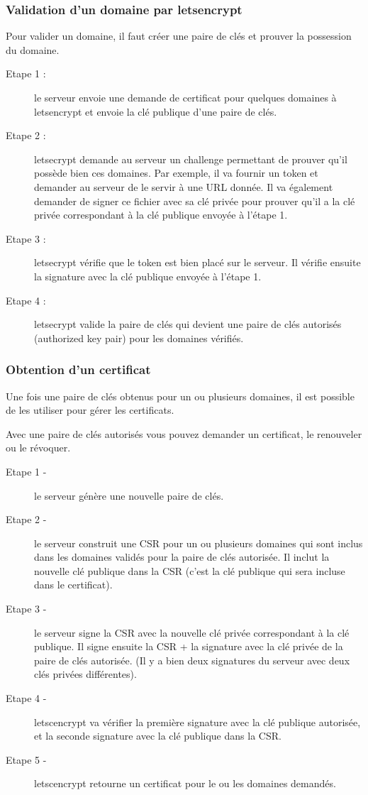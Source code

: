 \documentclass{article}
\begin{document}
\subsubsection{Validation d'un domaine par letsencrypt}
Pour valider un domaine, il faut créer une paire de clés et prouver la possession du domaine.
\begin{description}
\item[Etape 1 :] le serveur envoie une demande de certificat pour quelques domaines à letsencrypt et envoie la clé publique d'une paire de clés.

\item[Etape 2 :] letsecrypt demande au serveur un challenge permettant de prouver qu'il possède bien ces domaines. Par exemple, il va fournir un token et demander au serveur de le servir à une URL donnée. Il va également demander de signer ce fichier avec sa clé privée pour prouver qu'il a la clé privée correspondant à la clé publique envoyée à l'étape 1.

\item[Etape 3 :] letsecrypt vérifie que le token est bien placé sur le serveur. Il vérifie ensuite la signature avec la clé publique envoyée à l'étape 1.

\item[Etape 4 :] letsecrypt valide la paire de clés qui devient une paire de clés autorisés (authorized key pair) pour les domaines vérifiés.

\end{description}
\subsubsection{Obtention d'un certificat}
Une fois une paire de clés obtenus pour un ou plusieurs domaines, il est possible de les utiliser pour gérer les certificats.

Avec une paire de clés autorisés vous pouvez demander un certificat, le renouveler ou le révoquer.
\begin{description}
\item[Etape 1 - ] le serveur génère une nouvelle paire de clés.

\item[Etape 2 - ] le serveur construit une CSR pour un ou plusieurs domaines qui sont inclus dans les domaines validés pour la paire de clés autorisée. Il inclut la nouvelle clé publique dans la CSR (c'est la clé publique qui sera incluse dans le certificat).

\item[Etape 3 - ] le serveur signe la CSR avec la nouvelle clé privée correspondant à la clé publique. Il signe ensuite la CSR + la signature avec la clé privée de la paire de clés autorisée. (Il y a bien deux signatures du serveur avec deux clés privées différentes).

\item[Etape 4 - ] letscencrypt va vérifier la première signature avec la clé publique autorisée, et la seconde signature avec la clé publique dans la CSR.

\item[Etape 5 - ] letscencrypt retourne un certificat pour le ou les domaines demandés.
\end{description}
\end{document}
